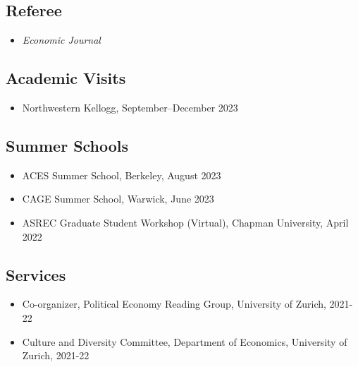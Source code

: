 \documentclass[letterpaper]{article}
\begin{document}
\subsection*{Referee}
\begin{itemize}
    \item \textit{Economic Journal}  %
\end{itemize}

\subsection*{Academic Visits}
\begin{itemize}
    \item Northwestern Kellogg, September--December 2023
\end{itemize}

\subsection*{Summer Schools}
\begin{itemize}
	\item ACES Summer School, Berkeley, August 2023
	\item CAGE Summer School, Warwick, June 2023
    \item ASREC Graduate Student Workshop (Virtual), Chapman University, April 2022
\end{itemize}

\subsection*{Services}
\begin{itemize}
    \item Co-organizer, Political Economy Reading Group, University of Zurich, 2021-22
    \item Culture and Diversity Committee, Department of Economics, University of Zurich, 2021-22
\end{itemize}

\end{document}
